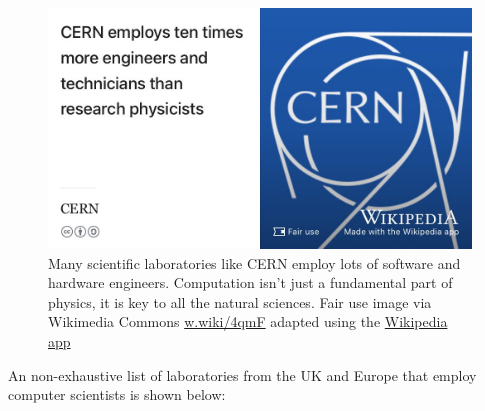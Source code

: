 \documentclass[
]{book}
\begin{document}
\begin{figure}

{\centering \includegraphics[width=1\linewidth]{images/cern-engineering} 

}

\caption{Many scientific laboratories like CERN employ lots of software and hardware engineers. Computation isn't just a fundamental part of physics, it is key to all the natural sciences. Fair use image via Wikimedia Commons \href{https://w.wiki/4qmF}{w.wiki/4qmF} adapted using the \href{https://apps.apple.com/us/app/wikipedia/id324715238}{Wikipedia app}}\label{fig:cern-fig}
\end{figure}



An non-exhaustive list of laboratories from the UK and Europe that employ computer scientists is shown below:
\end{document}
